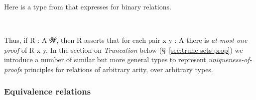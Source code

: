 \ccpad
Here is a type from \typtop that expresses  for binary relations.
\ccpad
\begin{code}%
\>[0][@{}l@{\AgdaIndent{0}}]%
\>[1]\AgdaSpace{}%
\AgdaSymbol{:}\AgdaSpace{}%
\AgdaSymbol{\{}\AgdaSpace{}%
\AgdaSymbol{:}\AgdaSpace{}%
\AgdaSpace{}%
\AgdaSymbol{\}}\AgdaSpace{}%
\AgdaSpace{}%
\AgdaSpace{}%
\AgdaSpace{}%
\AgdaSpace{}%
\AgdaSpace{}%
\AgdaSpace{}%
\AgdaSpace{}%
\AgdaSpace{}%
\<%
\\
%
\>[1]%
\>[25]\AgdaSpace{}%
\AgdaSymbol{=}\AgdaSpace{}%
\AgdaSpace{}%
\AgdaSpace{}%
\AgdaSpace{}%
\AgdaSpace{}%
\AgdaSpace{}%
\AgdaSymbol{(}\AgdaSpace{}%
\AgdaSpace{}%
\AgdaSymbol{)}\<%
\end{code}
\ccpad
Thus, if \ab R \as :  \ab A \ab 𝓦, then  \ab R asserts that for each pair \ab x \ab y \as : \ab A there is \emph{at most one proof} of \ab R \ab x \ab y. In the section on \emph{Truncation} below (\S~\ref{sec:trunc-sets-prop}) we introduce a number of similar but more general types to represent \emph{uniqueness-of-proofs} principles for relations of arbitrary arity, over arbitrary types.







\subsubsection{Equivalence relations}\label{equivalence-classes}

